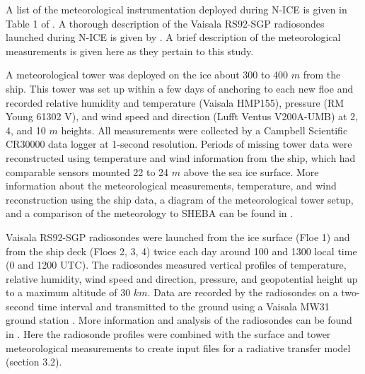 A list of the meteorological instrumentation deployed during N-ICE is given in Table 1 of \citet{cohen:2017}. A thorough description of the Vaisala RS92-SGP radiosondes launched during N-ICE is given by \citet{kayser:2017}. A brief description of the meteorological measurements is given here as they pertain to this study.

A meteorological tower was deployed on the ice about 300 to 400 $m$ from the ship. This tower was set up within a few days of anchoring to each new floe and recorded relative humidity and temperature (Vaisala HMP155), pressure (RM Young 61302 V), and wind speed and direction (Lufft Ventus V200A-UMB) at 2, 4, and 10 $m$ heights. All measurements were collected by a Campbell Scientific CR30000 data logger at 1-second resolution. Periods of missing tower data were reconstructed using temperature and wind information from the ship, which had comparable sensors mounted 22 to 24 $m$ above the sea ice surface. More information about the meteorological measurements, temperature, and wind reconstruction using the ship data, a diagram of the meteorological tower setup, and a comparison of the meteorology to SHEBA can be found in \citep{cohen:2017}. 

Vaisala RS92-SGP radiosondes were launched from the ice surface (Floe 1) and from the ship deck (Floes 2, 3, 4) twice each day around  100 and 1300 local time (0 and 1200 UTC). The radiosondes measured vertical profiles of temperature, relative humidity, wind speed and direction, pressure, and geopotential height up to a maximum altitude of 30 $km$. Data are recorded by the radiosondes on a two-second time interval and transmitted to the ground using a Vaisala MW31 ground station \citep{kayser:2017, cohen:2017}. More information and analysis of the radiosondes can be found in \citep{kayser:2017}. Here the radiosonde profiles were combined with the surface and tower meteorological measurements to create input files for a radiative transfer model (section 3.2).

